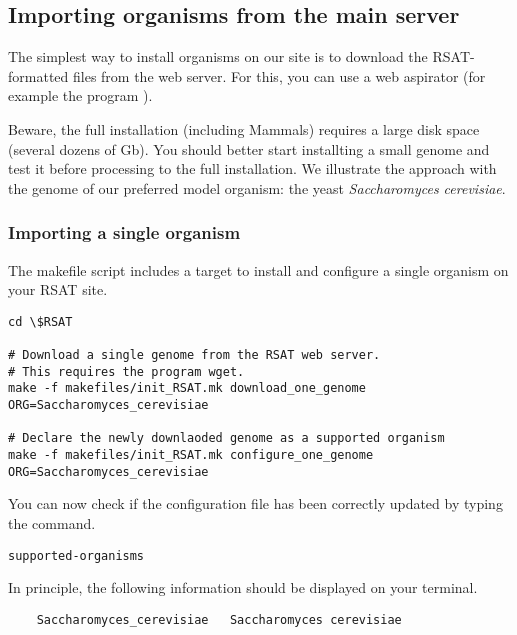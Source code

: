 \subsection{Importing organisms from the \RSAT main server}

The simplest way to install organisms on our \RSAT site is to download
the RSAT-formatted files from the web server. For this, you can use a
web aspirator (for example the program ). 

Beware, the full installation (including Mammals) requires a large
disk space (several dozens of Gb). You should better start installting
a small genome and test it before processing to the full
installation. We illustrate the approach with the genome of our
preferred model organism: the yeast \textit{Saccharomyces cerevisiae}.

\subsubsection{Importing a single organism}

The makefile script  includes a target to
install and configure a single organism on your RSAT site. 

\begin{small}
\begin{verbatim}
cd \$RSAT

# Download a single genome from the RSAT web server. 
# This requires the program wget.
make -f makefiles/init_RSAT.mk download_one_genome ORG=Saccharomyces_cerevisiae

# Declare the newly downlaoded genome as a supported organism
make -f makefiles/init_RSAT.mk configure_one_genome ORG=Saccharomyces_cerevisiae

\end{verbatim}
\end{small}

You can now check if the configuration file has been correctly updated
by typing the command.

\begin{verbatim}
supported-organisms
\end{verbatim}

In principle, the following information should be displayed on your
terminal.

\begin{small}
\begin{verbatim}
    Saccharomyces_cerevisiae   Saccharomyces cerevisiae
\end{verbatim}
\end{small}

